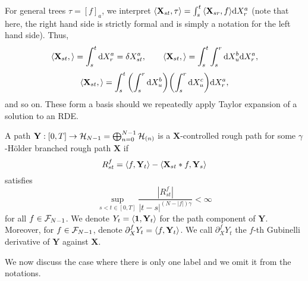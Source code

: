 \documentclass[a4paper, 10pt]{style/preprint}
\begin{document}
For general trees \(\tau = [f]_a\), we interpret \(\< \mathbf{X}_{st}, \tau\> = 
  \int_s^t \< \mathbf{X}_{sr}, f\> \dd X^a_r\) (note that here, the right hand side is strictly 
formal and is simply a notation for the left hand side). Thus, 
\[\< \mathbf{X}_{st}, \tree<X> \> = \int_s^t \dd X^a_r = \delta X^a_{st}, \qquad
  \< \mathbf{X}_{st}, \tree<1> \> = \int_s^t \int_s^r \dd X^b_u \dd X^a_r,\]
\[\< \mathbf{X}_{st}, \tree<2>\> = \int_s^t \left(\int_s^r \dd X^b_u\right) \left(\int_s^r \dd X^c_u\right) \dd X^a_r,\] 
and so on. These form a basis should we repeatedly apply Taylor expansion of a solution to an RDE.

\begin{definition}
  A path \(\mathbf{Y} : [0, T] \to {\mathcal H}_{N - 1} = \bigoplus_{n = 0}^{N - 1} {\mathcal H}_{(n)}\) is a 
  \(\mathbf{X}\)-controlled rough path for some \(\gamma\)-H\"older branched rough path \(\mathbf{X}\) if 
  \begin{equation}\label{eq:remainder}
    R^f_{st} = \< f, \mathbf{Y}_t\> - \< \mathbf{X}_{st} * f, \mathbf{Y}_s\>
  \end{equation}
  satisfies 
  \[\sup_{s < t \in [0, T]} \frac{|R^f_{st}|}{|t - s|^{(N - |f|)\gamma}} < \infty\] 
  for all \(f \in {\mathcal F}_{N - 1}\). We denote \(Y_t = \< \mathbf{1}, \mathbf{Y}_t\>\) for the 
  path component of \(\mathbf{Y}\). Moreover, for \(f \in {\mathcal F}_{N - 1}\), denote 
  \(\partial^f_X Y_t = \< f, \mathbf{Y}_t\>\). We call \(\partial^f_X Y_t\) the \(f\)-th Gubinelli 
  derivative of \(\mathbf{Y}\) against \(\mathbf{X}\).
\end{definition}

We now discuss the case where there is only one label and we omit it from the notations.
\end{document}
